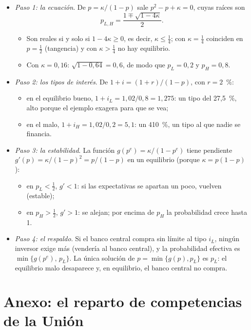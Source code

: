 \documentclass[11pt]{article}
\begin{document}
\begin{itemize}
\item \emph{Paso 1: la ecuación}. De $p=\kappa/(1-p)$ sale $p^2-p+\kappa=0$, cuyas raíces son
  $$p_{L,H}=\frac{1\mp\sqrt{1-4\kappa}}{2}.$$
  \begin{itemize}
  \item Son reales si y solo si $1-4\kappa\geq0$, es decir, $\kappa\leq\tfrac14$; con $\kappa=\tfrac14$ coinciden en $p=\tfrac12$ (tangencia) y con $\kappa>\tfrac14$ no hay equilibrio.
  \item Con $\kappa=0{,}16$: $\sqrt{1-0{,}64}=0{,}6$, de modo que $p_L=0{,}2$ y $p_H=0{,}8$.
  \end{itemize}
\item \emph{Paso 2: los tipos de interés}. De $1+i=(1+r)/(1-p)$, con $r=2$~\%:
  \begin{itemize}
  \item en el equilibrio bueno, $1+i_L=1{,}02/0{,}8=1{,}275$: un tipo del 27,5~\%, alto porque el ejemplo exagera para que se vea;
  \item en el malo, $1+i_H=1{,}02/0{,}2=5{,}1$: un 410~\%, un tipo al que nadie se financia.
  \end{itemize}
\item \emph{Paso 3: la estabilidad}. La función $g(p^e)=\kappa/(1-p^e)$ tiene pendiente $g'(p)=\kappa/(1-p)^2=p/(1-p)$ en un equilibrio (porque $\kappa=p(1-p)$):
  \begin{itemize}
  \item en $p_L<\tfrac12$, $g'<1$: si las expectativas se apartan un poco, vuelven (estable);
  \item en $p_H>\tfrac12$, $g'>1$: se alejan; por encima de $p_H$ la probabilidad crece hasta 1.
  \end{itemize}
\item \emph{Paso 4: el respaldo}. Si el banco central compra sin límite al tipo $i_L$, ningún inversor exige más (vendería al banco central), y la probabilidad efectiva es $\min\{g(p^e),\,p_L\}$. La única solución de $p=\min\{g(p),p_L\}$ es $p_L$: el equilibrio malo desaparece y, en equilibrio, el banco central no compra.\findemo
\end{itemize}

\section{Anexo: el reparto de competencias\cortetitulo{} de la Unión}\label{anexo:competencias}
\end{document}
